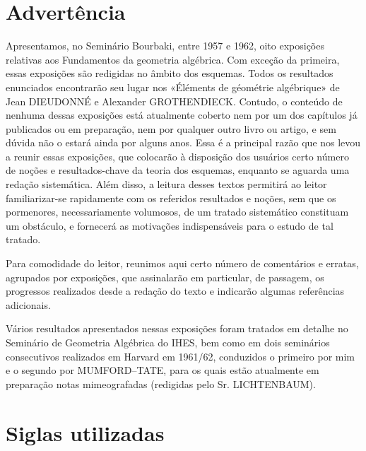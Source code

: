 \documentclass[11pt,twoside,openany]{book}
\numberwithin{equation}{section}
\theoremstyle{plain}
\theoremstyle{definition}
\theoremstyle{remark}
\begin{document}
\section*{Advertência}

Apresentamos, no Seminário Bourbaki, entre 1957 e 1962, oito exposições
relativas aos Fundamentos da geometria algébrica. Com exceção da primeira,
essas exposições são redigidas no âmbito dos esquemas. Todos os resultados
enunciados encontrarão seu lugar nos «Éléments de géométrie algébrique» de Jean
DIEUDONNÉ e Alexander GROTHENDIECK. Contudo, o conteúdo de nenhuma dessas
exposições está atualmente coberto nem por um dos capítulos já publicados ou
em preparação, nem por qualquer outro livro ou artigo, e sem dúvida não o
estará ainda por alguns anos. Essa é a principal razão que nos levou a reunir
essas exposições, que colocarão à disposição dos usuários certo número de
noções e resultados-chave da teoria dos esquemas, enquanto se aguarda uma
redação sistemática. Além disso, a leitura desses textos permitirá ao leitor
familiarizar-se rapidamente com os referidos resultados e noções, sem que os
pormenores, necessariamente volumosos, de um tratado sistemático constituam
um obstáculo, e fornecerá as motivações indispensáveis para o estudo de tal
tratado.

Para comodidade do leitor, reunimos aqui certo número de comentários e
erratas, agrupados por exposições, que assinalarão em particular, de passagem,
os progressos realizados desde a redação do texto e indicarão algumas
referências adicionais.

Vários resultados apresentados nessas exposições foram tratados em detalhe no
Seminário de Geometria Algébrica do IHES, bem como em dois seminários
consecutivos realizados em Harvard em 1961/62, conduzidos o primeiro por mim e
o segundo por MUMFORD--TATE, para os quais estão atualmente em preparação
notas mimeografadas (redigidas pelo Sr. LICHTENBAUM).

\section*{Siglas utilizadas}
\end{document}
